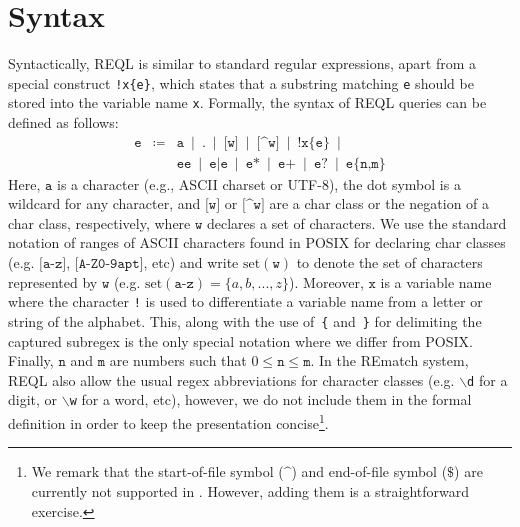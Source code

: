 \section{Syntax} 
Syntactically, REQL is similar to standard regular expressions, apart from a
special construct \texttt{!x\{e\}}, which states that a substring matching
\texttt{e} should be stored into the variable name \texttt{x}. Formally, the
syntax of REQL queries can be defined as follows:
$$
\begin{array}{rcl}
\texttt{e} & \coloneqq & \texttt{a} \ \mid \ \texttt{.} \ \mid \
\texttt{[w]} \ \mid \ \texttt{[\textasciicircum w]} \ \mid \
\texttt{!x\{e\}}  \ \mid \\
& &  \texttt{e} \texttt{e} \ \mid \
\texttt{e|e} \ \mid \ \texttt{e*} \ \mid \ \texttt{e+} \ \mid \ \texttt{e?} \ \mid \ \texttt{e\{n,m\}}
\end{array}
$$
Here, $\texttt{a}$ is a character (e.g., ASCII charset or UTF-8), the dot symbol
is a wildcard for any character, and $\texttt{[w]}$ or
$\texttt{[\textasciicircum w]}$ are a char class or the negation of a char
class, respectively, where $\texttt{w}$ declares a set of characters. We use the
standard notation of ranges of ASCII characters found in POSIX for declaring
char classes (e.g. $\texttt{[a-z]}$, $\texttt{[A-Z0-9apt]}$, etc) and write
$\text{set}(\texttt{w})$ to denote the set of characters represented by
$\texttt{w}$ (e.g. $\text{set}(\texttt{a-z}) = \{a, b, ..., z\}$). Moreover,
$\texttt{x}$ is a variable name where the character \texttt{!} is used to
differentiate a variable name from a letter or string of the alphabet. This,
along with the use of~\texttt{\{} and~\texttt{\}} for delimiting the captured
subregex is the only special notation where we differ from POSIX. Finally,
$\texttt{n}$ and $\texttt{m}$ are numbers such that $0 \leq \texttt{n} \leq
\texttt{m}$. In the REmatch system, REQL also allow the usual regex
abbreviations for character classes (e.g. \texttt{$\backslash$d} for a digit, or
\texttt{$\backslash$w} for a word, etc), however, we do not include them in the
formal definition in order to keep the presentation concise\footnote{We remark
that the start-of-file symbol ($\texttt{\textasciicircum}$) and end-of-file
symbol ($\texttt{\$}$) are currently not supported in \rematch. However, adding
them is a straightforward exercise.}.


